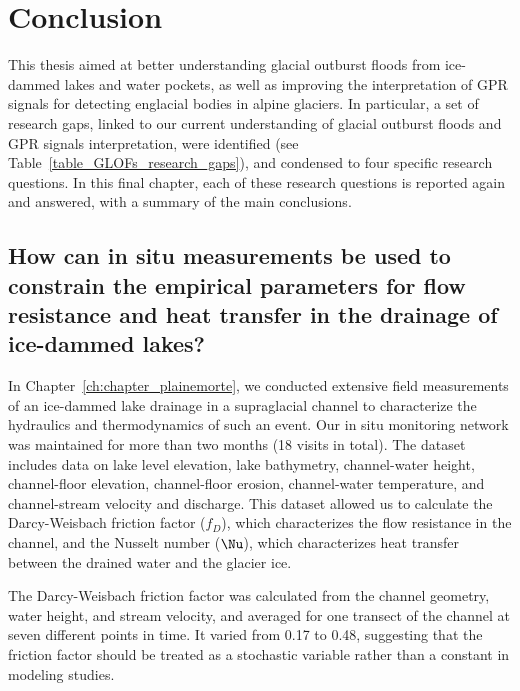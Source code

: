 \chapter{Conclusion}
\label{ch:summary}

This thesis aimed at better understanding glacial outburst floods from ice-dammed lakes and water pockets, as well as improving the interpretation of GPR signals for detecting englacial bodies in alpine glaciers. In particular, a set of research gaps, linked to our current understanding of glacial outburst floods and GPR signals interpretation, were identified (see Table~\ref{table_GLOFs_research_gaps}), and condensed to four specific research questions. In this final chapter, each of these research questions is reported again and answered, with a summary of the main conclusions.

\section{How can in situ measurements be used to constrain the empirical parameters for flow resistance and heat transfer in the drainage of ice-dammed lakes?}

In Chapter~\ref{ch:chapter_plainemorte}, we conducted extensive field measurements of an ice-dammed lake drainage in a supraglacial channel to characterize the hydraulics and thermodynamics of such an event. Our in situ monitoring network was maintained for more than two months (18 visits in total). The dataset includes data on lake level elevation, lake bathymetry, channel-water height, channel-floor elevation, channel-floor erosion, channel-water temperature, and channel-stream velocity and discharge. This dataset allowed us to calculate the Darcy-Weisbach friction factor ($f_D$), which characterizes the flow resistance in the channel, and the Nusselt number ($\Nu$), which characterizes heat transfer between the drained water and the glacier ice.
%

The Darcy-Weisbach friction factor was calculated from the channel geometry, water height, and stream velocity, and averaged for one transect of the channel at seven different points in time. It varied from 0.17 to 0.48, suggesting that the friction factor should be treated as a stochastic variable rather than a constant in modeling studies.
%


